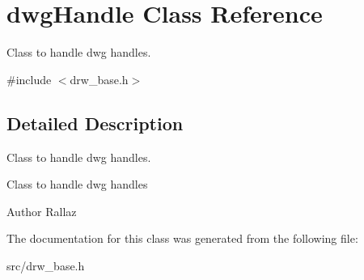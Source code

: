 \hypertarget{classdwg_handle}{}\section{dwg\+Handle Class Reference}
\label{classdwg_handle}


Class to handle dwg handles.  




{\ttfamily \#include $<$drw\+\_\+base.\+h$>$}



\subsection{Detailed Description}
Class to handle dwg handles. 

Class to handle dwg handles \begin{DoxyAuthor}{Author}
Rallaz 
\end{DoxyAuthor}


The documentation for this class was generated from the following file\+:\begin{DoxyCompactItemize}
\item 
src/drw\+\_\+base.\+h\end{DoxyCompactItemize}
